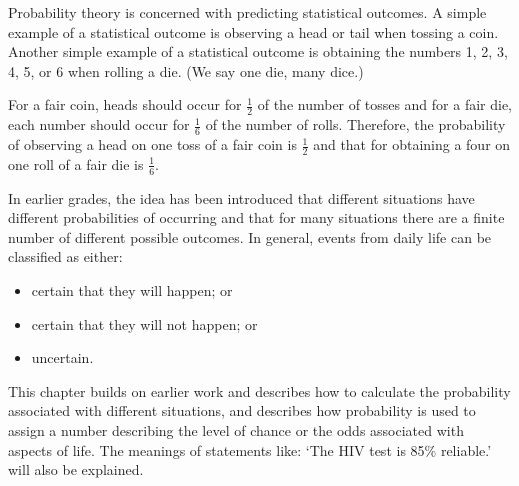\documentclass[10pt,a4paper,titlepage,twoside,openright]{report}
\begin{document}
Probability theory is concerned with predicting statistical outcomes. A simple example of a statistical outcome is observing a head or tail when tossing a coin. Another simple example of a statistical outcome is obtaining the numbers 1, 2, 3, 4, 5, or 6 when rolling a die. (We say one die, many dice.)

For a fair coin, heads should occur for $\frac{1}{2}$ of the number of tosses and for a fair die, each number should occur for $\frac{1}{6}$ of the number of rolls. Therefore, the probability of observing a head on one toss of a fair coin is $\frac{1}{2}$ and that for obtaining a four on one roll of a fair die is $\frac{1}{6}$.

In earlier grades, the idea has been introduced that different situations have different probabilities of occurring and that for many situations there are a finite number of different possible outcomes. In general, events from daily life can be classified as either:
\begin{itemize}
\item certain that they will happen; or
\item certain that they will not happen; or
\item uncertain.
\end{itemize}

This chapter builds on earlier work and describes how to calculate the probability associated with different situations, and describes how probability is used to assign a number describing the level of chance or the odds associated with aspects of life. The meanings of statements like: `The HIV test is 85\% reliable.' will also be explained.

\end{document}
